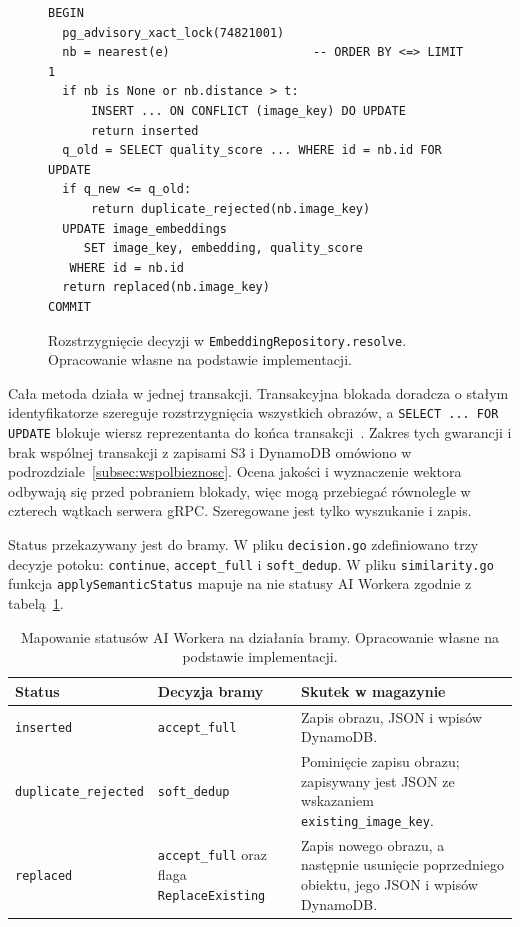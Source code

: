\begin{figure}[!htbp]
\centering
\begin{lstlisting}[basicstyle=\ttfamily\small,breaklines=true]
BEGIN
  pg_advisory_xact_lock(74821001)
  nb = nearest(e)                    -- ORDER BY <=> LIMIT 1
  if nb is None or nb.distance > t:
      INSERT ... ON CONFLICT (image_key) DO UPDATE
      return inserted
  q_old = SELECT quality_score ... WHERE id = nb.id FOR UPDATE
  if q_new <= q_old:
      return duplicate_rejected(nb.image_key)
  UPDATE image_embeddings
     SET image_key, embedding, quality_score
   WHERE id = nb.id
  return replaced(nb.image_key)
COMMIT
\end{lstlisting}
\caption{Rozstrzygnięcie decyzji w \texttt{EmbeddingRepository.resolve}.
Opracowanie własne na podstawie implementacji.}
\label{fig:ai-resolve-algo}
\end{figure}

Cała metoda działa w jednej transakcji. Transakcyjna blokada doradcza
o stałym identyfikatorze szereguje rozstrzygnięcia wszystkich obrazów,
a \texttt{SELECT ... FOR UPDATE} blokuje wiersz reprezentanta do
końca transakcji~\cite{postgres16_locking}. Zakres tych gwarancji
i brak wspólnej transakcji z zapisami S3 i DynamoDB omówiono
w podrozdziale~\ref{subsec:wspolbieznosc}. Ocena jakości i wyznaczenie
wektora odbywają się przed pobraniem blokady, więc mogą przebiegać
równolegle w czterech wątkach serwera gRPC. Szeregowane jest tylko
wyszukanie i zapis.

Status przekazywany jest do bramy. W pliku \texttt{decision.go}
zdefiniowano trzy decyzje potoku: \texttt{continue},
\texttt{accept\_full} i \texttt{soft\_dedup}.
W pliku \texttt{similarity.go} funkcja
\texttt{apply\allowbreak Semantic\allowbreak Status} mapuje na nie statusy AI Workera zgodnie
z tabelą~\ref{tab:ai-status-mapping}.

\begin{table}[!htbp]
\centering
\caption{Mapowanie statusów AI Workera na działania bramy.
Opracowanie własne na podstawie implementacji.}
\label{tab:ai-status-mapping}
\begin{tabular}{|p{}|p{}|p{}|}
\hline
\textbf{Status} & \textbf{Decyzja bramy} & \textbf{Skutek w magazynie} \\
\hline
\texttt{inserted} & \texttt{accept\_full} & Zapis obrazu, JSON
i wpisów DynamoDB. \\
\hline
\texttt{duplicate\_\allowbreak rejected} & \texttt{soft\_dedup} & Pominięcie
zapisu obrazu; zapisywany jest JSON ze wskazaniem
\texttt{existing\_image\_key}. \\
\hline
\texttt{replaced} & \texttt{accept\_full} oraz flaga \texttt{Replace\allowbreak Existing}
& Zapis nowego obrazu, a następnie usunięcie poprzedniego obiektu,
jego JSON i wpisów DynamoDB. \\
\hline
\end{tabular}
\end{table}

